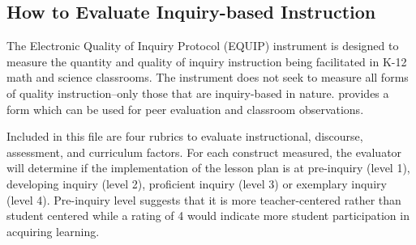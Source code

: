\subsection*{How to Evaluate Inquiry-based Instruction}
The Electronic Quality of Inquiry Protocol (EQUIP) instrument is designed to measure
the quantity and quality of inquiry instruction being facilitated in K-12 math and science
classrooms. The instrument does not seek to measure all forms of quality instruction–only those
that are inquiry-based in nature. \textcite{4e2} provides a form which can be used for peer
evaluation and classroom observations.

Included in this file are four rubrics to evaluate instructional, discourse, assessment, and
curriculum factors. For each construct measured, the evaluator will determine if the implementation of the lesson plan is at pre-inquiry (level 1), developing inquiry (level 2),
proficient inquiry (level 3) or exemplary inquiry (level 4). Pre-inquiry level suggests that it is
more teacher-centered rather than student centered while a rating of 4 would indicate more
student participation in acquiring learning.